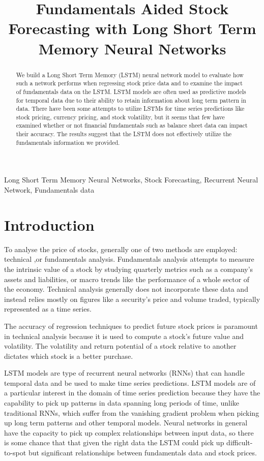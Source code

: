 \documentclass{article}
\title{Fundamentals Aided Stock Forecasting with Long Short Term Memory Neural Networks}
\begin{document}
%
\maketitle
%
\begin{abstract}
We build a Long Short Term Memory (LSTM) neural network model to evaluate how such a network performs when regressing stock price data and to examine the impact of fundamentals data on the LSTM. LSTM models are often used as predictive models for temporal data due to their ability to retain information about long term pattern in data. There have been some attempts to utilize LSTMs for time series predictions like stock pricing, currency pricing, and stock volatility\cite{maknickienė_rutkauskas_maknickas_2011}, but it seems that few have examined whether or not financial fundamentals such as balance sheet data can impact their accuracy. The results suggest that the LSTM does not effectively utilize the fundamentals information we provided.
\end{abstract}
%
\begin{keywords}
Long Short Term Memory Neural Networks, Stock Forecasting, Recurrent Neural Network, Fundamentals data
\end{keywords}
%
\section{Introduction}
\label{sec:intro}

To analyse the price of stocks, generally one of two methods are employed: technical ,or fundamentals analysis. Fundamentals analysis attempts to measure the intrinsic value of a stock by studying quarterly metrics such as a company’s assets and liabilities, or macro trends like the performance of a whole sector of the economy. Technical analysis generally does not incorporate these data and instead relies mostly on figures like a security's price and volume traded, typically represented as a time series. 

The accuracy of regression techniques to predict future stock prices is paramount in technical analysis because it is used to compute a stock's future value and volatility. The volatility and return potential of a stock relative to another dictates which stock is a better purchase.

LSTM models are type of recurrent neural networks (RNNs) that can handle temporal data and be used to make time series predictions. LSTM models are of a particular interest in the domain of time series prediction because they have the capability to pick up patterns in data spanning long periods of time, unlike traditional RNNs, which suffer from the vanishing gradient problem when picking up long term patterns and other temporal models. Neural networks in general have the capacity to pick up complex relationships between input data, so there is some chance that that given the right data the LSTM could pick up difficult-to-spot but significant relationships between fundamentals data and stock prices.  
\end{document}
